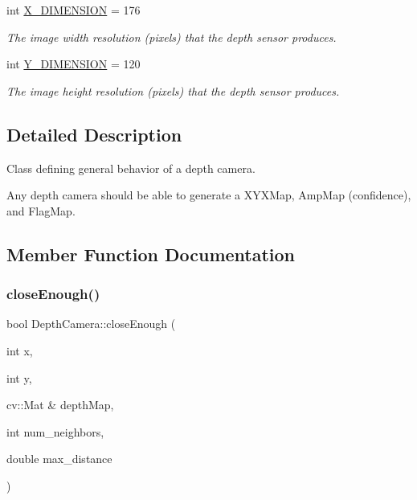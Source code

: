 \begin{DoxyCompactItemize}
int \hyperlink{class_depth_camera_a6e72272880679c710fb4aaeedf1d8309}{X\+\_\+\+D\+I\+M\+E\+N\+S\+I\+ON} = 176
\begin{DoxyCompactList}\small\item\em The image width resolution (pixels) that the depth sensor produces. \end{DoxyCompactList}\item 
int \hyperlink{class_depth_camera_a9c69a2e4d68fc09737317a638ad71f4a}{Y\+\_\+\+D\+I\+M\+E\+N\+S\+I\+ON} = 120
\begin{DoxyCompactList}\small\item\em The image height resolution (pixels) that the depth sensor produces. \end{DoxyCompactList}\end{DoxyCompactItemize}


\subsection{Detailed Description}
Class defining general behavior of a depth camera. 

Any depth camera should be able to generate a X\+Y\+X\+Map, Amp\+Map (confidence), and Flag\+Map. 

\subsection{Member Function Documentation}
\hypertarget{class_depth_camera_ab24ac78c2cf29b0410c3d5e0dfc9a243}{}\label{class_depth_camera_ab24ac78c2cf29b0410c3d5e0dfc9a243} 
\subsubsection{\texorpdfstring{close\+Enough()}{closeEnough()}}
{\footnotesize\ttfamily bool Depth\+Camera\+::close\+Enough (\begin{DoxyParamCaption}\item[{int}]{x,  }\item[{int}]{y,  }\item[{cv\+::\+Mat \&}]{depth\+Map,  }\item[{int}]{num\+\_\+neighbors,  }\item[{double}]{max\+\_\+distance }\end{DoxyParamCaption})\hspace{0.3cm}{\ttfamily [protected]}}



